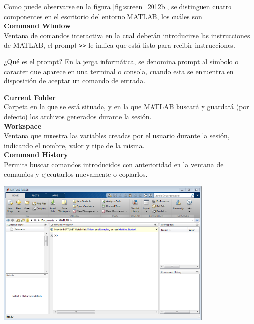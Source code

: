 Como puede observarse en la figura \ref{fig:screen_2012b}, se
distinguen cuatro componentes en el escritorio del entorno MATLAB, los
cuáles son: \\

\textbf{Command Window} \\

Ventana de comandos interactiva en la cual deberán introducirse las
instrucciones de MATLAB, el prompt \verb|>>| le indica que está listo para 
recibir instrucciones. \\

\begin{informacion}{¿Qué es el prompt?}
En la jerga informática, se denomina prompt al símbolo o
caracter que aparece en una terminal o consola, cuando
esta se encuentra en disposición de aceptar un comando
de entrada.
\end{informacion}

\textbf{Current Folder} \\

Carpeta en la que se está situado, y en la que MATLAB buscará y guardará
(por defecto) los archivos generados durante la sesión. \\

\textbf{Workspace} \\

Ventana que muestra las variables creadas por el usuario durante la
sesión, indicando el nombre, valor y tipo de la misma. \\

\textbf{Command History} \\

Permite buscar comandos introducidos con anterioridad en la ventana de
comandos y ejecutarlos nuevamente o copiarlos. \\

\begin{center}
\includegraphics[width=0.8\textwidth]{images/ch1/img_1_1.png}
\label{fig:screen_2012b}
\end{center}

